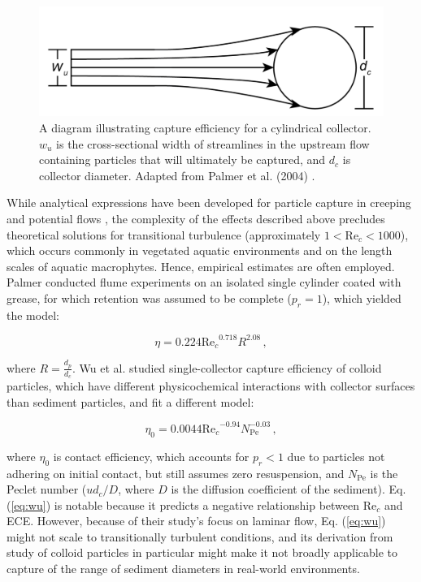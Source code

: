 \documentclass[geosciences,article,submit,moreauthors,pdftex]{Definitions/mdpi}
\newcommand\Rey{\mathrm{Re}}
\newcommand\Pec{\mathrm{Pe}}
\begin{document}
\begin{figure}[H]
\includegraphics[width=5in]{../pics/collectorefficiency.png}
\centering
\caption{A diagram illustrating capture efficiency for a cylindrical collector. $w_u$ is the cross-sectional width of streamlines in the upstream flow containing particles that will ultimately be captured, and $d_c$ is collector diameter. Adapted from Palmer et al. (2004) \cite{Palmer_2004}.}
\label{fig:capeff}
\end{figure}

While analytical expressions have been developed for particle capture in creeping and potential flows \cite{lamb1932, langmuir1942filtration, fuchs1965mechanics}, the complexity of the effects described above precludes theoretical solutions for transitional turbulence (approximately $1<\Rey_c<1000$), which occurs commonly in vegetated aquatic environments and on the length scales of aquatic macrophytes. Hence, empirical estimates are often employed. Palmer conducted flume experiments on an isolated single cylinder coated with grease, for which retention was assumed to be complete ($p_r = 1$), which yielded the model:

\begin{equation}
    \eta=0.224{\Rey_c}^{0.718}R^{2.08}\,,
    \label{eq:palmer}
\end{equation}

\noindent where $R = \frac{d_p}{d_c}$. Wu et al. \cite{Wu_2011} studied single-collector capture efficiency of colloid particles, which have different physicochemical interactions with collector surfaces than sediment particles, and fit a different model:

\begin{equation}
    \eta_0=0.0044{\Rey_c}^{-0.94}N_{\Pec}^{-0.03}\,,
    \label{eq:wu}
\end{equation}

\noindent where $\eta_0$ is contact efficiency, which accounts for $p_r < 1$ due to particles not adhering on initial contact, but still assumes zero resuspension, and $N_{\Pec}$ is the Peclet number ($ud_c/D$, where $D$ is the diffusion coefficient of the sediment). Eq. (\ref{eq:wu}) is notable because it predicts a negative relationship between $\Rey_c$ and ECE. However, because of their study's focus on laminar flow, Eq. (\ref{eq:wu}) might not scale to transitionally turbulent conditions, and its derivation from study of colloid particles in particular might make it not broadly applicable to capture of the range of sediment diameters in real-world environments.
\end{document}
